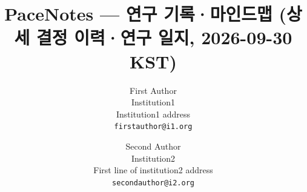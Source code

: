 \documentclass[10pt,twocolumn,letterpaper]{article}
\title{PaceNotes --- 연구 기록·마인드맵 (상세 결정 이력·연구 일지, 2026-09-30 KST)}
\author{First Author\\
Institution1\\
Institution1 address\\
{\tt\small firstauthor@i1.org}
\and
Second Author\\
Institution2\\
First line of institution2 address\\
{\tt\small secondauthor@i2.org}
}
\begin{document}
\maketitle

    




{
    \small
    
    
}

% 
\end{document}

